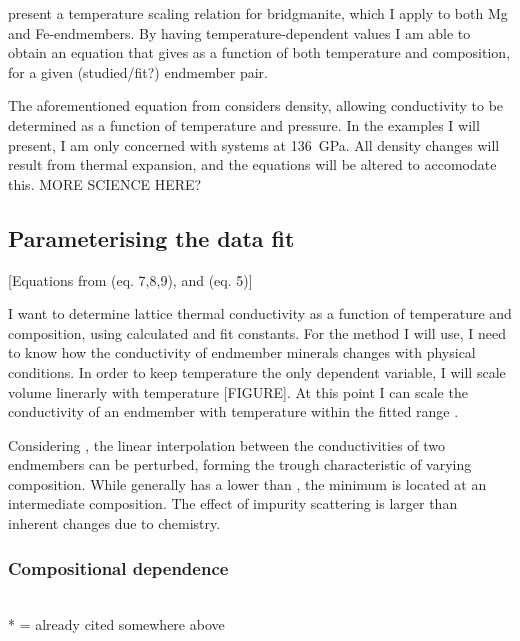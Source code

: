 \citet{Okuda2017} present a temperature scaling relation for bridgmanite, which I apply to both Mg and Fe-endmembers. By having temperature-dependent values I am able to obtain an equation that gives \tcs as a function of both temperature and composition, for a given (studied/fit?) endmember pair.

The aforementioned equation from \citet{Okuda2017} considers density, allowing conductivity to be determined as a function of temperature and pressure. In the examples I will present, I am only concerned with systems at 136~GPa. All density changes will result from thermal expansion, and the equations will be altered to accomodate this. MORE SCIENCE HERE?

\subsection{Parameterising the data fit} 

[Equations from \cite{Ohta2017} (eq. 7,8,9), and \cite{Okuda2017} (eq. 5)]

I want to determine lattice thermal conductivity as a function of temperature and composition, using calculated and fit constants. For the method I will use, I need to know how the conductivity of endmember minerals changes with physical conditions. In order to keep temperature the only dependent variable, I will scale volume linerarly with temperature [FIGURE]. At this point I can scale the conductivity of an endmember with temperature within the fitted range \citep{Okuda2017}.

Considering \citet{Ohta2017}, the linear interpolation between the conductivities of two endmembers can be perturbed, forming the trough characteristic of varying composition. While \fesios generally has a lower \tcs than \mgsio, the minimum is located at an intermediate composition. The effect of impurity scattering is larger than inherent changes due to chemistry.
    
\subsubsection{Compositional dependence}
\cite{Ohta2017}\\
* = already cited somewhere above\\

